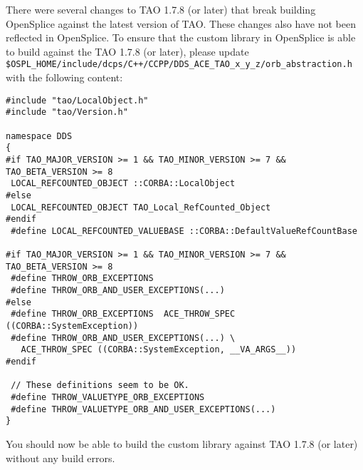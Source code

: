 There were several changes to TAO 1.7.8 (or later) that break
building OpenSplice against the latest version of TAO. These
changes also have not been reflected in OpenSplice. To ensure
that the custom library in OpenSplice is able to build against
the TAO 1.7.8 (or later), please update 
\texttt{\$OSPL\_HOME/include/dcps/C++/CCPP/DDS\_ACE\_TAO\_x\_y\_z/orb\_abstraction.h}
with the following content:
\begin{lstlisting}
#include "tao/LocalObject.h"
#include "tao/Version.h"

namespace DDS
{
#if TAO_MAJOR_VERSION >= 1 && TAO_MINOR_VERSION >= 7 && TAO_BETA_VERSION >= 8
 LOCAL_REFCOUNTED_OBJECT ::CORBA::LocalObject
#else
 LOCAL_REFCOUNTED_OBJECT TAO_Local_RefCounted_Object
#endif
 #define LOCAL_REFCOUNTED_VALUEBASE ::CORBA::DefaultValueRefCountBase

#if TAO_MAJOR_VERSION >= 1 && TAO_MINOR_VERSION >= 7 && TAO_BETA_VERSION >= 8
 #define THROW_ORB_EXCEPTIONS
 #define THROW_ORB_AND_USER_EXCEPTIONS(...)
#else
 #define THROW_ORB_EXCEPTIONS  ACE_THROW_SPEC ((CORBA::SystemException))
 #define THROW_ORB_AND_USER_EXCEPTIONS(...) \
   ACE_THROW_SPEC ((CORBA::SystemException, __VA_ARGS__))
#endif

 // These definitions seem to be OK.
 #define THROW_VALUETYPE_ORB_EXCEPTIONS
 #define THROW_VALUETYPE_ORB_AND_USER_EXCEPTIONS(...)
}
\end{lstlisting}
You should now be able to build the custom library against 
TAO 1.7.8 (or later) without any build errors.